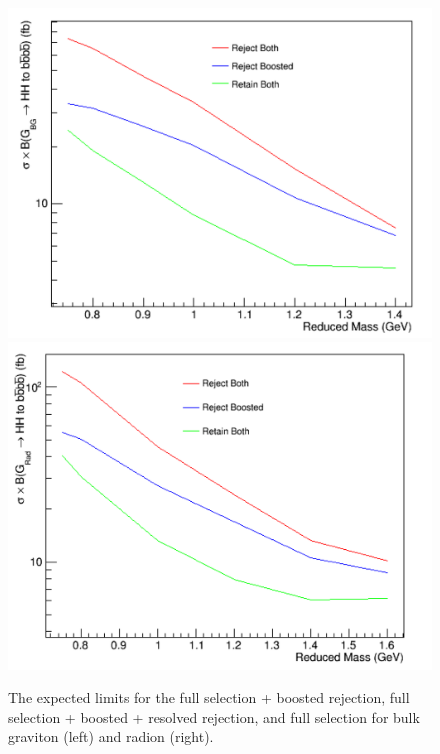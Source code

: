 \begin{figure}[thb!]
\begin{center}
\includegraphics[scale=0.35]{Figures/BGLim_v2.pdf} 
\includegraphics[scale=0.35]{Figures/RadLim_v2.pdf} 
\end{center}
\caption{The expected limits for the full selection + boosted rejection, full selection + boosted + resolved rejection, and full selection for bulk graviton (left) and radion (right).}
\label{fig:combinedlimit}
\end{figure} 


